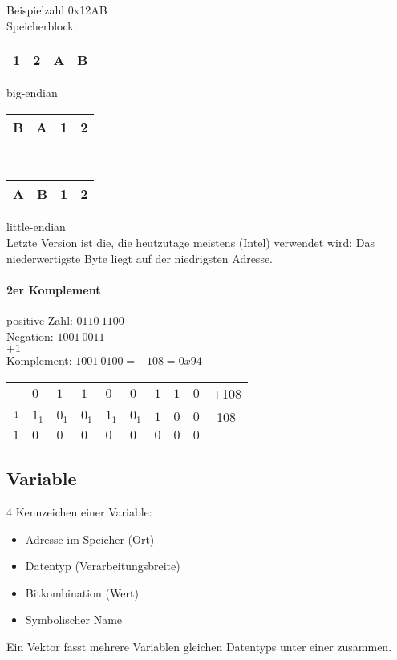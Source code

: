 Beispielzahl 0x12AB\medskip\\
Speicherblock:\\
\begin{tabular}{|l|l|l|l|}
\hline
1&2&A&B\\
\hline
\end{tabular} big-endian\\
\begin{tabular}{|l|l|l|l|}
\hline
B&A&1&2\\
\hline
\end{tabular}\\
\begin{tabular}{|l|l|l|l|}
\hline
A&B&1&2\\
\hline
\end{tabular} little-endian\\
Letzte Version ist die, die heutzutage meistens (Intel) verwendet wird: Das niederwertigste Byte liegt auf der niedrigsten Adresse.

\paragraph{2er Komplement}
positive Zahl: $\boxed{0}110 \: 1100$\\
Negation: $1001\: 0011$\\
$+1$\\
Komplement: $1001 \: 0100 = -108 = 0x94$\\
\begin{tabular}{r | l l l l l l l l l}
 & $0$&$1$&$1$&$0$&$0$&$1$&$1$&$0$ & +108\\
$_1$&$1_1$&$0_1$&$0_1$&$1_1$&$0_1$&$1$&$0$&$0$ & -108\\
\hline
$1$&$0$&$0$&$0$&$0$&$0$&$0$&$0$&$0$&\\

\end{tabular}

\subsection{Variable}
4 Kennzeichen einer Variable:
\begin{itemize}
\item Adresse im Speicher (Ort)
\item Datentyp (Verarbeitungsbreite)
\item Bitkombination (Wert)
\item Symbolischer Name
\end{itemize}
Ein Vektor fasst mehrere Variablen gleichen Datentyps unter einer zusammen.

